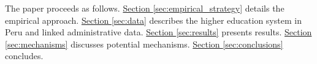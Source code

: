 


The paper proceeds as follows. \hyperref[sec:empirical_strategy]{Section \ref{sec:empirical_strategy}} details the empirical approach. \hyperref[sec:data]{Section \ref{sec:data}}  describes the higher education system in Peru and linked administrative data. \hyperref[sec:results]{Section \ref{sec:results}} presents results. \hyperref[sec:mechanisms]{Section \ref{sec:mechanisms}} discusses potential mechanisms. \hyperref[sec:conclusions]{Section \ref{sec:conclusions}} concludes.


